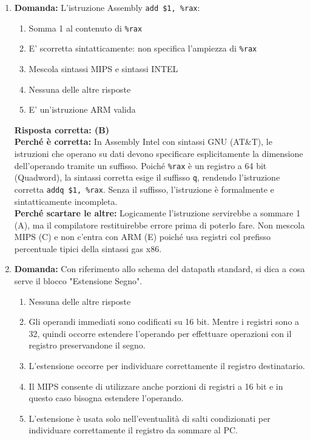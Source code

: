 \documentclass[12pt, a4paper]{article}
\begin{document}
\begin{enumerate}
    \item \textbf{Domanda:} L'istruzione Assembly \texttt{add \$1, \%rax}:
    \begin{enumerate}[label=(\Alph*)]
        \item Somma 1 al contenuto di \texttt{\%rax}
        \item E' scorretta sintatticamente: non specifica l'ampiezza di \texttt{\%rax}
        \item Mescola sintassi MIPS e sintassi INTEL
        \item Nessuna delle altre risposte
        \item E' un'istruzione ARM valida
    \end{enumerate}
    \textbf{Risposta corretta: (B)} \\
    \textbf{Perché è corretta:} In Assembly Intel con sintassi GNU (AT\&T), le istruzioni che operano su dati devono specificare esplicitamente la dimensione dell'operando tramite un suffisso. Poiché \texttt{\%rax} è un registro a 64 bit (Quadword), la sintassi corretta esige il suffisso \texttt{q}, rendendo l'istruzione corretta \texttt{addq \$1, \%rax}. Senza il suffisso, l'istruzione è formalmente e sintatticamente incompleta. \\
    \textbf{Perché scartare le altre:} Logicamente l'istruzione servirebbe a sommare 1 (A), ma il compilatore restituirebbe errore prima di poterlo fare. Non mescola MIPS (C) e non c'entra con ARM (E) poiché usa registri col prefisso percentuale tipici della sintassi gas x86.

    \item \textbf{Domanda:} Con riferimento allo schema del datapath standard, si dica a cosa serve il blocco "Estensione Segno".
    \begin{enumerate}[label=(\Alph*)]
        \item Nessuna delle altre risposte
        \item Gli operandi immediati sono codificati su 16 bit. Mentre i registri sono a 32, quindi occorre estendere l'operando per effettuare operazioni con il registro preservandone il segno.
        \item L'estensione occorre per individuare correttamente il registro destinatario.
        \item Il MIPS consente di utilizzare anche porzioni di registri a 16 bit e in questo caso bisogna estendere l'operando.
        \item L'estensione è usata solo nell'eventualità di salti condizionati per individuare correttamente il registro da sommare al PC.
    \end{enumerate}


\end{enumerate}
\end{document}
